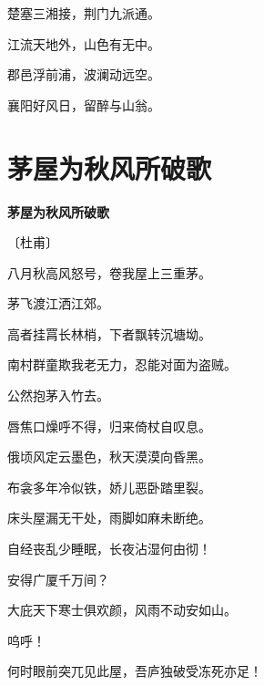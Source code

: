 \documentclass[12pt,UTF-8,openany,fontset=none]{ctexbook}
\begin{document}
    \vspace{18pt}

\begin{center}
    \begin{Large}

        楚塞三湘接，荆门九派通。

        江流天地外，山色有无中。

        郡邑浮前浦，波澜动远空。

        襄阳好风日，留醉与山翁。

    \end{Large}

\end{center}

\vspace{8pt}
\clearpage

\section{茅屋为秋风所破歌}


\begin{center}
    {\bfseries 茅屋为秋风所破歌}

    \vspace{18pt}

    \begin{large}\xuwen
        〔杜甫〕
    \end{large}

\end{center}

    \vspace{18pt}  %

\begin{center}
    \begin{Large}

        八月秋高风怒号，卷我屋上三重茅。

        茅飞渡江洒江郊。

        高者挂罥长林梢，下者飘转沉塘坳。

        南村群童欺我老无力，忍能对面为盗贼。\hspace{24pt}

        公然抱茅入竹去。

        唇焦口燥呼不得，归来倚杖自叹息。

        俄顷风定云墨色，秋天漠漠向昏黑。

        布衾多年冷似铁，娇儿恶卧踏里裂。

        床头屋漏无干处，雨脚如麻未断绝。

        自经丧乱少睡眠，长夜沾湿何由彻！

        安得广厦千万间？
        
        大庇天下寒士俱欢颜，风雨不动安如山。\hspace{24pt}

        呜呼！
        
        何时眼前突兀见此屋，吾庐独破受冻死亦足！

    \end{Large}

\end{center}
\end{document}
